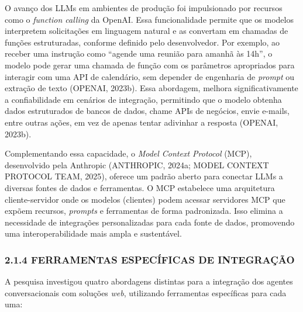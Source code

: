 \documentclass[
]{article}
\begin{document}
O avanço dos LLMs em ambientes de produção foi impulsionado por recursos
como o \emph{function calling} da OpenAI. Essa funcionalidade permite
que os modelos interpretem solicitações em linguagem natural e as
convertam em chamadas de funções estruturadas, conforme definido pelo
desenvolvedor. Por exemplo, ao receber uma instrução como ``agende uma
reunião para amanhã às 14h'', o modelo pode gerar uma chamada de função
com os parâmetros apropriados para interagir com uma API de calendário,
sem depender de engenharia de \emph{prompt} ou extração de texto
(OPENAI, 2023b). Essa abordagem, melhora significativamente a
confiabilidade em cenários de integração, permitindo que o modelo
obtenha dados estruturados de bancos de dados, chame APIs de negócios,
envie e-mails, entre outras ações, em vez de apenas tentar adivinhar a
resposta (OPENAI, 2023b).

Complementando essa capacidade, o \emph{Model Context Protocol} (MCP),
desenvolvido pela Anthropic (ANTHROPIC, 2024a; MODEL CONTEXT PROTOCOL
TEAM, 2025), oferece um padrão aberto para conectar LLMs a diversas
fontes de dados e ferramentas. O MCP estabelece uma arquitetura
cliente-servidor onde os modelos (clientes) podem acessar servidores MCP
que expõem recursos, \emph{prompts} e ferramentas de forma padronizada.
Isso elimina a necessidade de integrações personalizadas para cada fonte
de dados, promovendo uma interoperabilidade mais ampla e sustentável.

\subsubsection{2.1.4 FERRAMENTAS ESPECÍFICAS DE
INTEGRAÇÃO}\label{ferramentas-especuxedficas-de-integrauxe7uxe3o}

A pesquisa investigou quatro abordagens distintas para a integração dos
agentes conversacionais com soluções \emph{web}, utilizando ferramentas
específicas para cada uma:
\end{document}

